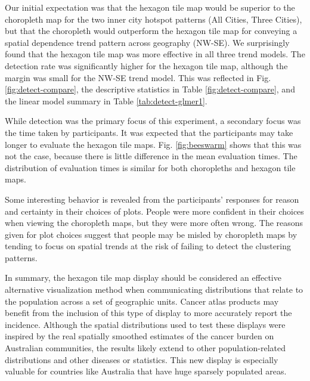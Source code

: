 \documentclass[journal]{vgtc}                     %
\begin{document}

Our initial expectation was that the hexagon tile map would be superior to the choropleth map for the two inner city hotspot patterns (All Cities, Three Cities), but that the choropleth would outperform the hexagon tile map for conveying a spatial dependence trend pattern across geography (NW-SE). We surprisingly found that the hexagon tile map was more effective in all three trend models. The detection rate was significantly higher for the hexagon tile map, although the margin was small for the NW-SE trend model.  This was reflected in Fig. \ref{fig:detect-compare}, the descriptive statistics in Table \ref{fig:detect-compare}, and the linear model summary in Table \ref{tab:detect-glmer1}.

While detection was the primary focus of this experiment, a secondary focus was the time taken by participants. It was expected that the participants may take longer to evaluate the hexagon tile maps. Fig. \ref{fig:beeswarm} shows that this was not the case, because there is little difference in the mean evaluation times. The distribution of evaluation times is similar for both choropleths and hexagon tile maps.

Some interesting behavior is revealed from the participants' responses for reason and certainty in their choices of plots. People were more confident in their choices when viewing the choropleth maps, but they were more often wrong. The reasons given for plot choices suggest that people may be misled by choropleth maps by tending to focus on spatial trends at the risk of failing to detect the clustering patterns.

In summary, the hexagon tile map display should be considered an effective alternative visualization method when communicating distributions that relate to the population across a set of geographic units. Cancer atlas products may benefit from the inclusion of this type of display to more accurately report the incidence. Although the spatial distributions used to test these displays were inspired by the real spatially smoothed estimates of the cancer burden on Australian communities, the results likely extend to other population-related distributions and other diseases or statistics. This new display is especially valuable for countries like Australia that have huge sparsely populated areas. 
\end{document}
